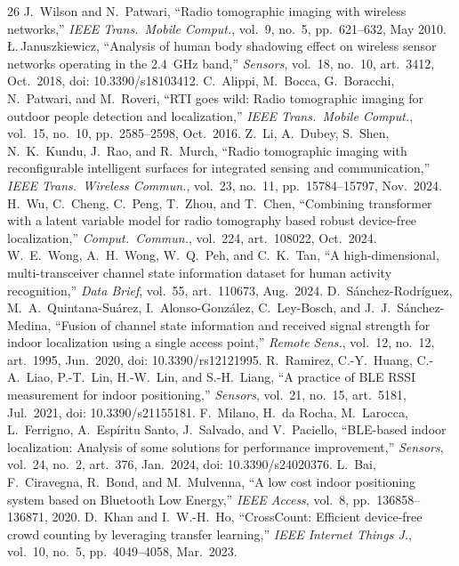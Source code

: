 \documentclass[conference,10pt]{IEEEtran}
\begin{document}
\balance
\begin{thebibliography}{26}
 J.~Wilson and N.~Patwari, ``Radio tomographic imaging with wireless networks,'' \emph{IEEE Trans.\ Mobile Comput.}, vol.~9, no.~5, pp.~621--632, May 2010.
 {\L}.\,Januszkiewicz, ``Analysis of human body shadowing effect on wireless sensor networks operating in the 2.4~GHz band,'' \emph{Sensors}, vol.~18, no.~10, art.~3412, Oct.~2018, doi: 10.3390/s18103412.
 C.~Alippi, M.~Bocca, G.~Boracchi, N.~Patwari, and M.~Roveri, ``RTI goes wild: Radio tomographic imaging for outdoor people detection and localization,'' \emph{IEEE Trans.\ Mobile Comput.}, vol.~15, no.~10, pp.~2585--2598, Oct.~2016.
 Z.~Li, A.~Dubey, S.~Shen, N.~K.~Kundu, J.~Rao, and R.~Murch, ``Radio tomographic imaging with reconfigurable intelligent surfaces for integrated sensing and communication,'' \emph{IEEE Trans.\ Wireless Commun.}, vol.~23, no.~11, pp.~15784--15797, Nov.~2024.
 H.~Wu, C.~Cheng, C.~Peng, T.~Zhou, and T.~Chen, ``Combining transformer with a latent variable model for radio tomography based robust device-free localization,'' \emph{Comput.\ Commun.}, vol.~224, art.~108022, Oct.~2024.
 W.~E.~Wong, A.~H.~Wong, W.~Q.~Peh, and C.~K.~Tan, ``A high-dimensional, multi-transceiver channel state information dataset for human activity recognition,'' \emph{Data Brief}, vol.~55, art.~110673, Aug.~2024.
 D.~S\'anchez-Rodr\'iguez, M.~A.~Quintana-Su\'arez, I.~Alonso-Gonz\'alez, C.~Ley-Bosch, and J.~J.~S\'anchez-Medina, ``Fusion of channel state information and received signal strength for indoor localization using a single access point,'' \emph{Remote Sens.}, vol.~12, no.~12, art.~1995, Jun.~2020, doi: 10.3390/rs12121995.
 R.~Ramirez, C.-Y.~Huang, C.-A.~Liao, P.-T.~Lin, H.-W.~Lin, and S.-H.~Liang, ``A practice of BLE RSSI measurement for indoor positioning,'' \emph{Sensors}, vol.~21, no.~15, art.~5181, Jul.~2021, doi: 10.3390/s21155181.
 F.~Milano, H.~da Rocha, M.~Larocca, L.~Ferrigno, A.~Esp\'iritu Santo, J.~Salvado, and V.~Paciello, ``BLE-based indoor localization: Analysis of some solutions for performance improvement,'' \emph{Sensors}, vol.~24, no.~2, art.~376, Jan.~2024, doi: 10.3390/s24020376.
 L.~Bai, F.~Ciravegna, R.~Bond, and M.~Mulvenna, ``A low cost indoor positioning system based on Bluetooth Low Energy,'' \emph{IEEE Access}, vol.~8, pp.~136858--136871, 2020.
 D.~Khan and I.~W.-H.~Ho, ``CrossCount: Efficient device-free crowd counting by leveraging transfer learning,'' \emph{IEEE Internet Things J.}, vol.~10, no.~5, pp.~4049--4058, Mar.~2023.

\end{thebibliography}
\end{document}

